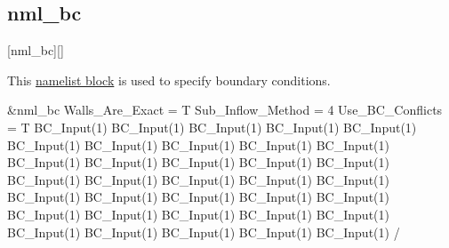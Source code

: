 \subsection{nml\_bc}
\label{SEC:nml_bc}
\inp*[nmlBC]{}[nml\_bc][]

This \hyperref[SEC:User_Input]{namelist block}
is used to specify boundary conditions.

\begin{nmlblocklst}[
,escapeinside={!@}{!@}
,label={LST:nml_bc}
,caption={Namelist nml\_bc.}
]
&nml_bc
  Walls_Are_Exact                          = T
  Sub_Inflow_Method                        = 4
  Use_BC_Conflicts                         = T
  BC_Input(1)%
  BC_Input(1)%
  BC_Input(1)%
  BC_Input(1)%
  BC_Input(1)%
  BC_Input(1)%
  BC_Input(1)%
  BC_Input(1)%
  BC_Input(1)%
  BC_Input(1)%
  BC_Input(1)%
  BC_Input(1)%
  BC_Input(1)%
  BC_Input(1)%
  BC_Input(1)%
  BC_Input(1)%
  BC_Input(1)%
  BC_Input(1)%
  BC_Input(1)%
  BC_Input(1)%
  BC_Input(1)%
  BC_Input(1)%
  BC_Input(1)%
  BC_Input(1)%
  BC_Input(1)%
  BC_Input(1)%
  BC_Input(1)%
  BC_Input(1)%
  BC_Input(1)%
  BC_Input(1)%
  BC_Input(1)%
  BC_Input(1)%
  BC_Input(1)%
  BC_Input(1)%
  BC_Input(1)%
/
\end{nmlblocklst}

